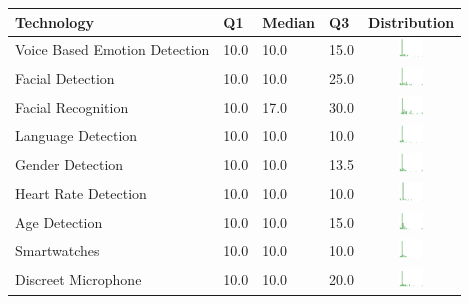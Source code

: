 \begin{table}[t]
\begin{center}
\small
\begin{tabular}{| p{2cm} | p{1cm} | p{1cm} | p{1cm} | c |}
\hline
Technology & Q1 &  Median & Q3 & Distribution  \\ 
\hline
Voice Based Emotion Detection  & 10.0 & 10.0 & 15.0 & \includegraphics[width = 2cm, height = 0.5cm]{tables/voicebasedemotiondetectionrisk} \\ 
Facial Detection  & 10.0 & 10.0 & 25.0 & \includegraphics[width = 2cm, height = 0.5cm]{tables/facialdetectionrisk} \\ 
Facial Recognition  & 10.0 & 17.0 & 30.0 & \includegraphics[width = 2cm, height = 0.5cm]{tables/facialrecognitionrisk} \\ 
Language Detection  & 10.0 & 10.0 & 10.0 & \includegraphics[width = 2cm, height = 0.5cm]{tables/languagedetectionrisk} \\ 
Gender Detection  & 10.0 & 10.0 & 13.5 & \includegraphics[width = 2cm, height = 0.5cm]{tables/genderdetectionrisk} \\ 
Heart Rate Detection  & 10.0 & 10.0 & 10.0 & \includegraphics[width = 2cm, height = 0.5cm]{tables/heartratedetectionrisk} \\ 
Age Detection  & 10.0 & 10.0 & 15.0 & \includegraphics[width = 2cm, height = 0.5cm]{tables/agedetectionrisk} \\ 
Smartwatches  & 10.0 & 10.0 & 10.0 & \includegraphics[width = 2cm, height = 0.5cm]{tables/smartwatchesrisk} \\ 
Discreet Microphone  & 10.0 & 10.0 & 20.0 & \includegraphics[width = 2cm, height = 0.5cm]{tables/discreetmicrophonerisk} \\ 

\end{tabular}
\end{center}
\end{table}
